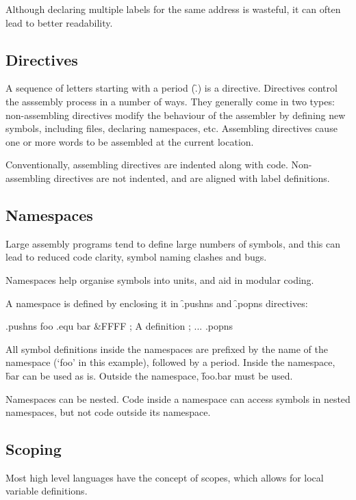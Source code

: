 Although declaring multiple labels for the same address is wasteful, it can
often lead to better readability.

\subsection{Directives}

A sequence of letters starting with a period (\f{.}) is a directive. Directives
control the asssembly process in a number of ways. They generally come in two
types: non-assembling directives modify the behaviour of the assembler by
defining new symbols, including files, declaring namespaces, etc. Assembling
directives cause one or more words to be assembled at the current location.

Conventionally, assembling directives are indented along with
code. Non-assembling directives are not indented, and are aligned with label
definitions.

\subsection{Namespaces}

Large assembly programs tend to define large numbers of symbols, and
this can lead to reduced code clarity, symbol naming clashes and bugs.

Namespaces help organise symbols into units, and aid in modular coding.

A namespace is defined by enclosing it in \f{.pushns} and \f{.popns}
directives:

\begin{cftasmcode}
.pushns foo
.equ bar &FFFF ; A definition
; ...
.popns
\end{cftasmcode}

All symbol definitions inside the namespaces are prefixed by the name
of the namespace (‘foo’ in this example), followed by a period. Inside
the namespace, \f{bar} can be used as is. Outside the namespace,
\f{foo.bar} must be used.

Namespaces can be nested. Code inside a namespace can access symbols
in nested namespaces, but not code outside its namespace.

\subsection{Scoping}

Most high level languages have the concept of scopes, which allows for
local variable definitions.

